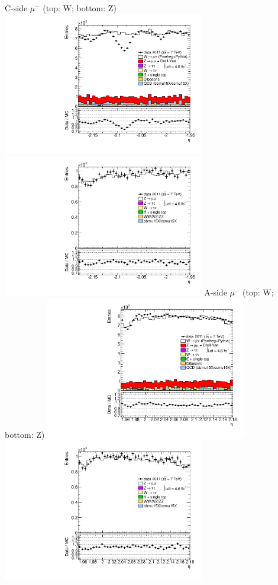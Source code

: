  {
\colb[T]
C-side $\mu^{-}$ (top: W; bottom: Z)
\centering
\includegraphics[width=0.66\textwidth]{dates/20130306/figures/etaphi/Wnonmu_10_C_stack_l_eta_NEG} \\
\includegraphics[width=0.66\textwidth]{dates/20130306/figures/etaphi/Z_10_C_stack_lN_eta_ALL.pdf}
A-side $\mu^{-}$ (top: W; bottom: Z)
\centering
\includegraphics[width=0.66\textwidth]{dates/20130306/figures/etaphi/Wnonmu_10_A_stack_l_eta_NEG} \\
\includegraphics[width=0.66\textwidth]{dates/20130306/figures/etaphi/Z_10_A_stack_lN_eta_ALL.pdf} 
\cole
}

